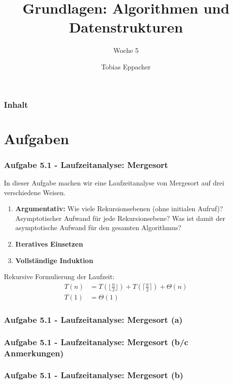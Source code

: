 \documentclass{beamer}
\title{Grundlagen: Algorithmen und Datenstrukturen}
\author{Tobias Eppacher}
\date{\presdatum}
\institute{School of Computation, Information and Technology}
\subtitle{Woche 5}
\begin{document}
\begin{frame}
	\titlepage
\end{frame}

\begin{frame}
	\frametitle{Inhalt}
	\tableofcontents[subsectionstyle=hide]
\end{frame}

\section{Aufgaben}
\begin{frame}
	\frametitle{Aufgabe 5.1 - Laufzeitanalyse: Mergesort}

	In dieser Aufgabe machen wir eine Laufzeitanalyse von Mergesort auf drei verschiedene Weisen.

	\renewcommand{\theenumi}{\alph{enumi}}
	\begin{enumerate}
		\item \textbf{Argumentativ: } Wie viele Rekursionsebenen (ohne initialen Aufruf)? Asymptotischer Aufwand für jede Rekursionsebene?
		      Was ist damit der asymptotische Aufwand für den gesamten Algorithmus?
		\item \textbf{Iteratives Einsetzen}
		\item \textbf{Vollständige Induktion}
	\end{enumerate}

	\medskip

	Rekursive Formulierung der Laufzeit:
	\begin{align*}
		T(n) & = T(\lfloor\frac{n}{2}\rfloor) + T(\lceil \frac{n}{2} \rceil) + \Theta(n) \\
		T(1) & = \Theta(1)
	\end{align*}

\end{frame}

\begin{frame}
	\frametitle{Aufgabe 5.1 - Laufzeitanalyse: Mergesort (a)}
\end{frame}

\begin{frame}
	\frametitle{Aufgabe 5.1 - Laufzeitanalyse: Mergesort (b/c Anmerkungen)}

\end{frame}

\begin{frame}
	\frametitle{Aufgabe 5.1 - Laufzeitanalyse: Mergesort (b)}
\end{frame}
\end{document}
